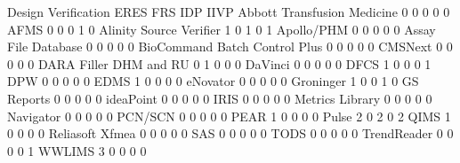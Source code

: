 \documentclass{article}
\begin{document}
\begin{Schunk}
\begin{Soutput}
                                Design Verification ERES FRS IDP IIVP
  Abbott Transfusion Medicine                     0    0   0   0    0
  AFMS                                            0    0   0   1    0
  Alinity Source Verifier                         1    0   1   0    1
  Apollo/PHM                                      0    0   0   0    0
  Assay File Database                             0    0   0   0    0
  BioCommand Batch Control Plus                   0    0   0   0    0
  CMSNext                                         0    0   0   0    0
  DARA Filler DHM and RU                          0    1   0   0    0
  DaVinci                                         0    0   0   0    0
  DFCS                                            1    0   0   0    1
  DPW                                             0    0   0   0    0
  EDMS                                            1    0   0   0    0
  eNovator                                        0    0   0   0    0
  Groninger                                       1    0   0   1    0
  GS Reports                                      0    0   0   0    0
  ideaPoint                                       0    0   0   0    0
  IRIS                                            0    0   0   0    0
  Metrics Library                                 0    0   0   0    0
  Navigator                                       0    0   0   0    0
  PCN/SCN                                         0    0   0   0    0
  PEAR                                            1    0   0   0    0
  Pulse                                           2    0   2   0    2
  QIMS                                            1    0   0   0    0
  Reliasoft Xfmea                                 0    0   0   0    0
  SAS                                             0    0   0   0    0
  TODS                                            0    0   0   0    0
  TrendReader                                     0    0   0   0    1
  WWLIMS                                          3    0   0   0    0
                               

\end{Soutput}
\end{Schunk}
\end{document}
